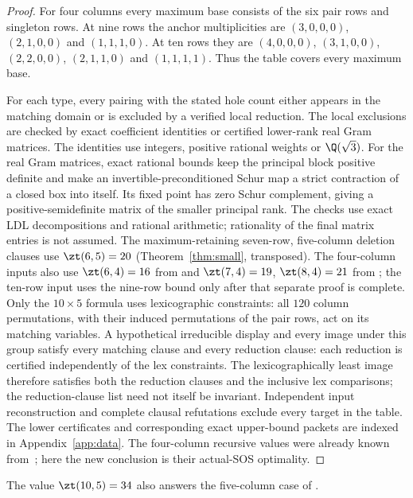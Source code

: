 \begin{proof}
For four columns every maximum base consists of the six pair rows and
singleton rows. At nine rows the anchor multiplicities are
$(3,0,0,0)$, $(2,1,0,0)$ and $(1,1,1,0)$. At ten rows they are
$(4,0,0,0)$, $(3,1,0,0)$, $(2,2,0,0)$, $(2,1,1,0)$ and $(1,1,1,1)$. Thus the table covers every maximum base.

For each type, every pairing with the stated hole count either appears
in the matching domain or is excluded by a verified local reduction. The local exclusions are checked by
exact coefficient identities or certified lower-rank real Gram matrices.
The identities use integers, positive rational weights or $\Q(\sqrt3)$.
For the real Gram matrices, exact rational bounds keep the principal
block positive definite and make an invertible-preconditioned Schur map
a strict contraction of a closed box into itself. Its fixed point has
zero Schur complement, giving a positive-semidefinite matrix of the
smaller principal rank. The checks use exact LDL decompositions and
rational arithmetic; rationality of the final matrix entries is not assumed. The maximum-retaining seven-row, five-column deletion clauses use
$\zt(6,5)=20$ (Theorem~\ref{thm:small}, transposed).
The four-column inputs also use $\zt(6,4)=16$ from
\cite[Corollary~4.23]{LQ} and $\zt(7,4)=19$, $\zt(8,4)=21$ from
\cite[Theorems~4.2 and~4.4]{XY}; the ten-row input uses the nine-row
bound only after that separate proof is complete. Only the $10\times5$ formula uses lexicographic constraints: all $120$
column permutations, with their induced permutations of the pair rows,
act on its matching variables. A hypothetical irreducible display and
every image under this group satisfy every matching clause and every
reduction clause: each reduction is certified independently of the lex
constraints. The lexicographically least image therefore satisfies both the
reduction clauses and the inclusive lex comparisons; the reduction-clause
list need not itself be invariant.
Independent input reconstruction and
complete clausal refutations exclude every target in the table. The
lower certificates and corresponding exact upper-bound packets are
indexed in Appendix~\ref{app:data}. The four-column recursive values
were already known from~\cite{CC}; here the new conclusion is their
actual-SOS optimality.
\end{proof}

The value $\zt(10,5)=34$ also answers the five-column case of
\cite[Section~8, Open Problem~1]{CLQIncidence}.

